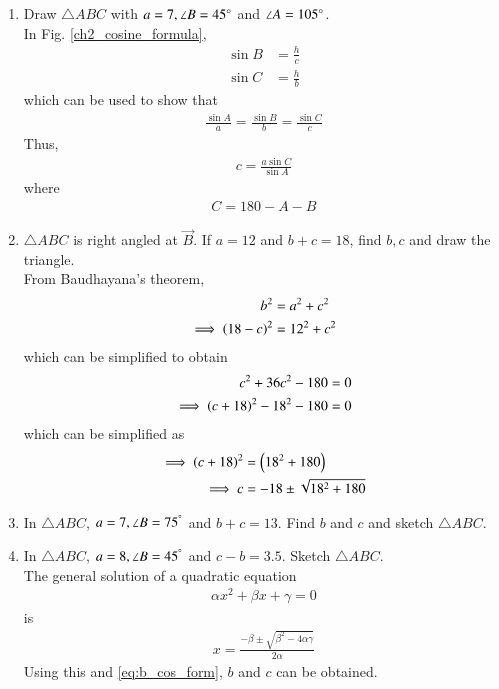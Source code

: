 \documentclass[journal,12pt,twocolumn]{IEEEtran}
\renewcommand\thesection{\arabic{section}}
\begin{document}
\begin{enumerate}[label=\thesection.\arabic*
,ref=\thesection.\theenumi]
\item Draw $\triangle ABC$ with $a = 7, \angle B = 45\degree$ and $\angle A = 105 \degree$. 
\\
\solution In Fig. \eqref{ch2_cosine_formula},	
\begin{align}
\label{eq:sin_form_def}
\sin B &= \frac{h}{c}
\\
\sin C &= \frac{h}{b}
\end{align}
%
which can be used to show that
\begin{align}
\label{eq:sin_form}
\frac{\sin A}{a}=\frac{\sin B}{b}=\frac{\sin C}{c}
\end{align}
%
Thus, 
\begin{align}
c = \frac{a\sin C}{\sin A}
\end{align}
where
\begin{align}
C = 180-A-B
\end{align}
\item $\triangle ABC$ is right angled at $\vec{B}$.  If $a = 12$ and $b+c = 18$, find $b,c$ and draw the triangle.
\\
\solution From Baudhayana's theorem, 
\begin{align}
b^2 &= a^2 + c^2
\\
\implies \left(18-c\right)^2 &= 12^2 +c^2
\end{align}
which can be simplified to obtain
\begin{align}
c^2 + 36c^2 -180&= 0
\\
\implies\left(c + 18\right)^2 -18^2 - 180 &= 0
\\
\end{align}
which can be simplified as
\begin{align}
\implies \left(c+18 \right)^2 &= \left(18^2+180\right)
\\
\implies c &= -18 \pm \sqrt{18^2+180}
\end{align}
\item In $\triangle ABC$,  $a = 7, \angle B = 75^{\degree}$ and $b+c = 13$. 
Find $b$ and $c$ and sketch $\triangle ABC$.
\item In $\triangle ABC$,  $a = 8, \angle B = 45^{\degree}$ and $c-b = 3.5$.
Sketch $\triangle ABC$.
\\
\solution The general solution of a quadratic equation  
\begin{align}
\label{eq:quad_eq}
\alpha x^2+\beta x+\gamma = 0
\end{align}
%
is
\begin{align}
\label{eq:quad_eq_sol}
x = \frac{-\beta \pm \sqrt{\beta^2-4\alpha\gamma}}{2\alpha}
\end{align}
%
Using this and \eqref{eq:b_cos_form}, $b$ and $c$ can be obtained.


\end{enumerate}
\end{document}
